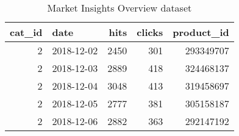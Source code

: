 \begin{table}
\centering
\caption{Market Insights Overview dataset}
\label{market_insights_overview_11-12-21}
\begin{tabular}{rlrrr}
\toprule
 cat\_id &       date &  hits &  clicks &  product\_id \\
\midrule
      2 & 2018-12-02 &  2450 &     301 &   293349707 \\
      2 & 2018-12-03 &  2889 &     418 &   324468137 \\
      2 & 2018-12-04 &  3048 &     413 &   319458697 \\
      2 & 2018-12-05 &  2777 &     381 &   305158187 \\
      2 & 2018-12-06 &  2882 &     363 &   292147192 \\
\bottomrule
\end{tabular}
\end{table}
